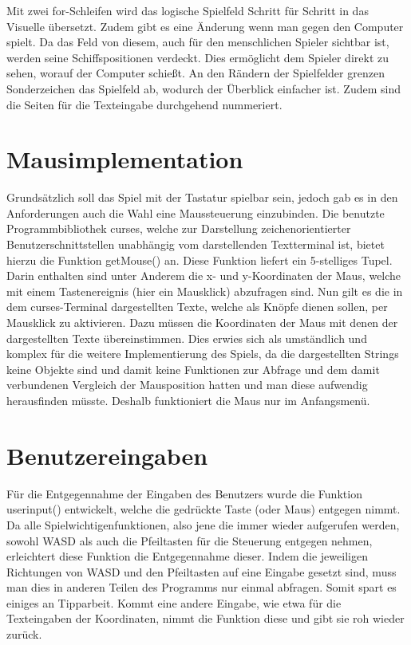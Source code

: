 \documentclass{llncs}
\begin{document}
Mit zwei for-Schleifen wird das logische Spielfeld Schritt für Schritt in das Visuelle übersetzt. Zudem gibt es eine Änderung wenn man gegen den Computer spielt. Da das Feld von diesem,
auch für den menschlichen Spieler sichtbar ist, werden seine Schiffspositionen verdeckt. Dies ermöglicht dem Spieler direkt zu sehen, worauf der Computer schießt. 
An den Rändern der Spielfelder grenzen Sonderzeichen das Spielfeld ab, wodurch der Überblick einfacher ist. Zudem sind die Seiten für die Texteingabe durchgehend nummeriert.

\section{Mausimplementation}

Grundsätzlich soll das Spiel mit der Tastatur spielbar sein, jedoch gab es in den Anforderungen auch die Wahl eine Maussteuerung einzubinden.
Die benutzte Programmbibliothek \glqq curses\grqq{}, welche zur Darstellung zeichenorientierter Benutzerschnittstellen unabhängig vom darstellenden Textterminal ist,
bietet hierzu die Funktion \glqq getMouse()\grqq{} an. Diese Funktion liefert ein 5-stelliges Tupel. Darin enthalten sind unter Anderem die x- und y-Koordinaten der Maus,
welche mit einem Tastenereignis (hier ein Mausklick) abzufragen sind. Nun gilt es die in dem curses-Terminal dargestellten Texte, welche als Knöpfe dienen sollen,
per Mausklick zu aktivieren. Dazu müssen die Koordinaten der Maus mit denen der dargestellten Texte übereinstimmen. Dies erwies sich als umständlich und komplex für die
weitere Implementierung des Spiels, da die dargestellten Strings keine Objekte sind und damit keine Funktionen zur Abfrage und dem damit verbundenen Vergleich der Mausposition hatten und man diese aufwendig herausfinden müsste.
Deshalb funktioniert die Maus nur im Anfangsmenü.

\section{Benutzereingaben}

Für die Entgegennahme der Eingaben des Benutzers wurde die Funktion \glqq userinput()\grqq{} entwickelt, welche die gedrückte Taste (oder Maus) entgegen nimmt.
Da alle Spielwichtigenfunktionen, also jene die immer wieder aufgerufen werden, sowohl WASD als auch die Pfeiltasten für die Steuerung entgegen nehmen, erleichtert diese
Funktion die Entgegennahme dieser. Indem die jeweiligen Richtungen von WASD und den Pfeiltasten auf eine Eingabe gesetzt sind, muss man dies in anderen Teilen des Programms
nur einmal abfragen. Somit spart es einiges an Tipparbeit. Kommt eine andere Eingabe, wie etwa für die Texteingaben der Koordinaten, nimmt die Funktion diese und gibt sie
roh wieder zurück.
\end{document}
